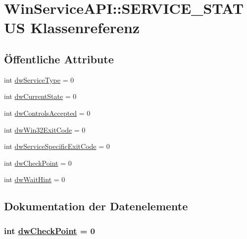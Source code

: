 \hypertarget{classQbeSAS_1_1WinServiceAPI_1_1SERVICE__STATUS}{
\section{Win\-Service\-API::SERVICE\_\-STATUS Klassenreferenz}
\label{classQbeSAS_1_1WinServiceAPI_1_1SERVICE__STATUS}
}
\subsection*{\"{O}ffentliche Attribute}
\begin{CompactItemize}
\item 
int \hyperlink{classQbeSAS_1_1WinServiceAPI_1_1SERVICE__STATUS_QbeSAS_1_1WinServiceAPI_1_1SERVICE__STATUSo0}{dw\-Service\-Type} = 0
\item 
int \hyperlink{classQbeSAS_1_1WinServiceAPI_1_1SERVICE__STATUS_QbeSAS_1_1WinServiceAPI_1_1SERVICE__STATUSo1}{dw\-Current\-State} = 0
\item 
int \hyperlink{classQbeSAS_1_1WinServiceAPI_1_1SERVICE__STATUS_QbeSAS_1_1WinServiceAPI_1_1SERVICE__STATUSo2}{dw\-Controls\-Accepted} = 0
\item 
int \hyperlink{classQbeSAS_1_1WinServiceAPI_1_1SERVICE__STATUS_QbeSAS_1_1WinServiceAPI_1_1SERVICE__STATUSo3}{dw\-Win32Exit\-Code} = 0
\item 
int \hyperlink{classQbeSAS_1_1WinServiceAPI_1_1SERVICE__STATUS_QbeSAS_1_1WinServiceAPI_1_1SERVICE__STATUSo4}{dw\-Service\-Specific\-Exit\-Code} = 0
\item 
int \hyperlink{classQbeSAS_1_1WinServiceAPI_1_1SERVICE__STATUS_QbeSAS_1_1WinServiceAPI_1_1SERVICE__STATUSo5}{dw\-Check\-Point} = 0
\item 
int \hyperlink{classQbeSAS_1_1WinServiceAPI_1_1SERVICE__STATUS_QbeSAS_1_1WinServiceAPI_1_1SERVICE__STATUSo6}{dw\-Wait\-Hint} = 0
\end{CompactItemize}


\subsection{Dokumentation der Datenelemente}
\hypertarget{classQbeSAS_1_1WinServiceAPI_1_1SERVICE__STATUS_QbeSAS_1_1WinServiceAPI_1_1SERVICE__STATUSo5}{
\subsubsection[dwCheckPoint]{\setlength{\rightskip}{0pt plus 5cm}int \hyperlink{classQbeSAS_1_1WinServiceAPI_1_1SERVICE__STATUS_QbeSAS_1_1WinServiceAPI_1_1SERVICE__STATUSo5}{dw\-Check\-Point} = 0}}
\label{classQbeSAS_1_1WinServiceAPI_1_1SERVICE__STATUS_QbeSAS_1_1WinServiceAPI_1_1SERVICE__STATUSo5}




